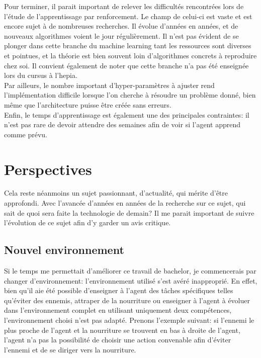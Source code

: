 \documentclass[11pt,a4paper]{report}
\begin{document}
  \par Pour terminer, il parait important de relever les difficultés rencontrées lors de l'étude de l'apprentissage par renforcement. Le champ de celui-ci est vaste et est encore sujet à de nombreuses recherches. Il évolue d'années en années, et de nouveaux algorithmes voient le jour régulièrement. Il n'est pas évident de se plonger dans cette branche du machine learning tant les ressources sont diverses et pointues, et la théorie est bien souvent loin d'algorithmes concrets à reproduire chez soi. Il convient également de noter que cette branche n'a pas été enseignée lors du cursus à l'hepia. \\
  Par ailleurs, le nombre important d'hyper-paramètres à ajuster rend l'implémentation difficile lorsque l'on cherche à résoudre un problème donné, bien même que l'architecture puisse être créée sans erreurs. \\
  Enfin, le temps d'apprentissage est également une des principales contraintes: il n'est pas rare de devoir attendre des semaines afin de voir si l'agent apprend comme prévu. 
  
  \section{Perspectives}
  
   \par Cela reste néanmoins un sujet passionnant, d'actualité, qui mérite d'être approfondi. Avec l'avancée d'années en années de la recherche sur ce sujet, qui sait de quoi sera faite la technologie de demain? Il me parait important de suivre l'évolution de ce sujet afin d'y garder un avis critique. 

  \subsection{Nouvel environnement}  
  
  \par Si le temps me permettait d'améliorer ce travail de bachelor, je commencerais par changer d'environnement: l'environnement utilisé s'est avéré inapproprié. En effet, bien qu'il aie été possible d'enseigner à l'agent des tâches spécifiques telles qu'éviter des ennemis, attraper de la nourriture ou enseigner à l'agent à évoluer dans l'environnement complet en utilisant uniquement deux compétences, l'environnement choisi n'est pas adapté. Prenons l'exemple suivant: si l'ennemi le plus proche de l'agent et la nourriture se trouvent en bas à droite de l'agent, l'agent n'a pas la possibilité de choisir une action convenable afin d'éviter l'ennemi et de se diriger vers la nourriture. 
\end{document}
